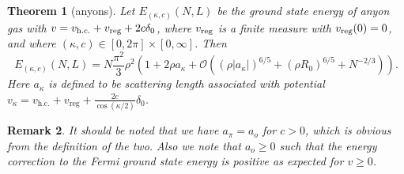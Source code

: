 \documentclass[a4paper,11pt]{article}
\newcommand{\abs}[1]{\left\lvert #1 \right\rvert}
\newtheorem{theorem}{Theorem}
\newtheorem{remark}[theorem]{Remark}
\numberwithin{equation}{section}
\begin{document}
\begin{theorem}[anyons]
\label{TheoremAnyon}
Let $ E_{(\kappa,c)}(N,L) $ be the ground state energy of anyon gas with $ v=v_{\textnormal{h.c.}}+v_{\textnormal{reg}}+2c\delta_0 $, where $ v_{\textnormal{reg}} $ is a finite measure with $ v_{\textnormal{reg}}(0)=0 $, and where $ (\kappa,c)\in [0,2\pi]\times [0,\infty] $. 
Then \begin{equation}
E_{(\kappa,c)}(N,L)=N\frac{\pi^2}{3}\rho^2\left(1+2\rho a_{\kappa}+\mathcal{O}
\left((\rho|a_\kappa|)^{6/5}+(\rho R_0)^{6/5}+N^{-2/3}\right)\right).
\end{equation}
Here $ a_\kappa $ is defined to be scattering length associated with potential $ v_\kappa=v_{\text{h.c.}}+v_{\text{reg}}+\frac{2c}{\cos(\kappa/2)}\delta_0 $.
\end{theorem}
\begin{remark}
	It should be noted that we have $ a_\pi=a_o $ for $ c>0 $, which is obvious from the definition of the two. Also we note that $ a_o\geq 0 $ such that the energy correction to the Fermi ground state energy is positive as expected for $ v\geq 0 $.
\end{remark}




\end{document}

